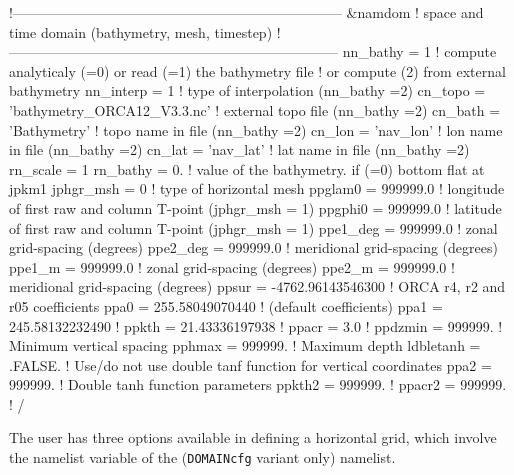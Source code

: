 \documentclass[../main/NEMO_manual]{subfiles}
\begin{document}
\begin{listing}
  \begin{forlines}
!-----------------------------------------------------------------------
&namdom        !   space and time domain (bathymetry, mesh, timestep)
!-----------------------------------------------------------------------
   nn_bathy    =    1      !  compute analyticaly (=0) or read (=1) the bathymetry file
                           !  or compute (2) from external bathymetry
   nn_interp   =    1                          ! type of interpolation (nn_bathy =2)                       
   cn_topo     =  'bathymetry_ORCA12_V3.3.nc'  ! external topo file (nn_bathy =2)
   cn_bath     =  'Bathymetry'                 ! topo name in file  (nn_bathy =2)
   cn_lon      =  'nav_lon'                    ! lon  name in file  (nn_bathy =2)
   cn_lat      =  'nav_lat'                    ! lat  name in file  (nn_bathy =2)
   rn_scale    = 1
   rn_bathy    =    0.     !  value of the bathymetry. if (=0) bottom flat at jpkm1
   jphgr_msh   =       0               !  type of horizontal mesh
   ppglam0     =  999999.0             !  longitude of first raw and column T-point (jphgr_msh = 1)
   ppgphi0     =  999999.0             ! latitude  of first raw and column T-point (jphgr_msh = 1)
   ppe1_deg    =  999999.0             !  zonal      grid-spacing (degrees)
   ppe2_deg    =  999999.0             !  meridional grid-spacing (degrees)
   ppe1_m      =  999999.0             !  zonal      grid-spacing (degrees)
   ppe2_m      =  999999.0             !  meridional grid-spacing (degrees)
   ppsur       =   -4762.96143546300   !  ORCA r4, r2 and r05 coefficients
   ppa0        =     255.58049070440   ! (default coefficients)
   ppa1        =     245.58132232490   !
   ppkth       =      21.43336197938   !
   ppacr       =       3.0             !
   ppdzmin     =  999999.              !  Minimum vertical spacing
   pphmax      =  999999.              !  Maximum depth
   ldbletanh   =  .FALSE.              !  Use/do not use double tanf function for vertical coordinates
   ppa2        =  999999.              !  Double tanh function parameters
   ppkth2      =  999999.              !
   ppacr2      =  999999.              !
/
  \end{forlines}
  \caption{}
  \label{lst:namdom_domcfg}
\end{listing}

The user has three options available in defining a horizontal grid, which involve the
namelist variable  of the  (\texttt{DOMAINcfg} variant only)
namelist.
\end{document}
